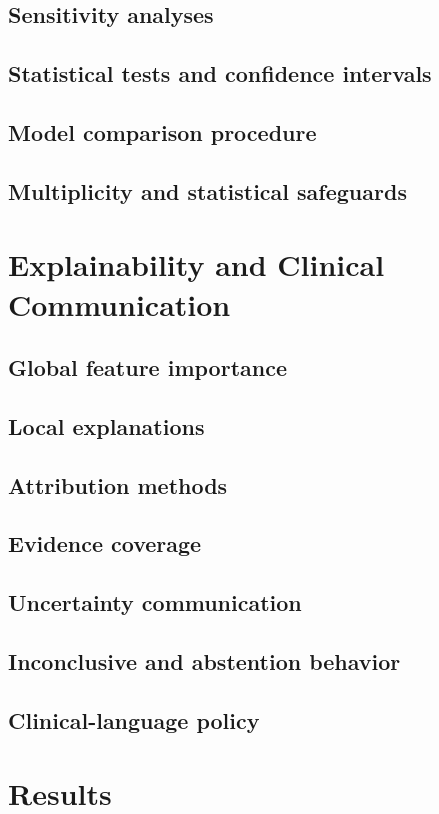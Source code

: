 \documentclass[10pt,journal]{IEEEtran}
\begin{document}
\subsection{Sensitivity analyses}
\subsection{Statistical tests and confidence intervals}
\subsection{Model comparison procedure}
\subsection{Multiplicity and statistical safeguards}

\section{Explainability and Clinical Communication}
\subsection{Global feature importance}
\subsection{Local explanations}
\subsection{Attribution methods}
\subsection{Evidence coverage}
\subsection{Uncertainty communication}
\subsection{Inconclusive and abstention behavior}
\subsection{Clinical-language policy}

\section{Results}
\end{document}
